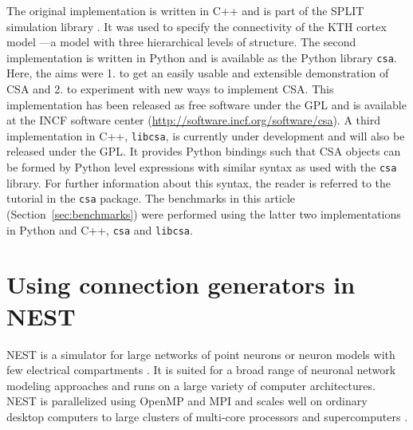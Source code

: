 \documentclass{frontiersSCNS} %
\begin{document}
The original
implementation is written in C++ and is part of the SPLIT simulation
library \citep{djurfeldt05}.  It was used to specify the connectivity
of the KTH cortex model \citep{djurfeldt08}---a model with three
hierarchical levels of structure.  The second implementation is
written in Python and is available as the Python library \verb|csa|.
Here, the aims were 1. to get an easily usable and extensible
demonstration of CSA and 2. to experiment with new ways to implement
CSA. This implementation has been released as free software under the
GPL and is available at the INCF software center
(\url{http://software.incf.org/software/csa}). A third implementation
in C++, \verb|libcsa|, is currently under development and will also be
released under the GPL. It provides Python bindings such that CSA
objects can be formed by Python level expressions with similar syntax
as used with the \verb|csa| library. For further information about
this syntax, the reader is referred to the tutorial in the \verb|csa|
package. The benchmarks in this article (Section~\ref{sec:benchmarks})
were performed using the latter two implementations in Python and C++,
\verb|csa| and \verb|libcsa|.




\section{Using connection generators in NEST}\label{sec:conn_gen_nest}

NEST is a simulator for large networks of point neurons or neuron
models with few electrical compartments
\citep[\url{http://www.nest-simulator.org};][]{Gewaltig_07_11204}. It
is suited for a broad range of neuronal network modeling approaches
and runs on a large variety of computer architectures. NEST is
parallelized using OpenMP \citep{OpenMPSpec} and MPI
\citep{MPIForum94} and scales well on ordinary desktop computers to
large clusters of multi-core processors and supercomputers
\citep{Helias12_26}.
\end{document}
